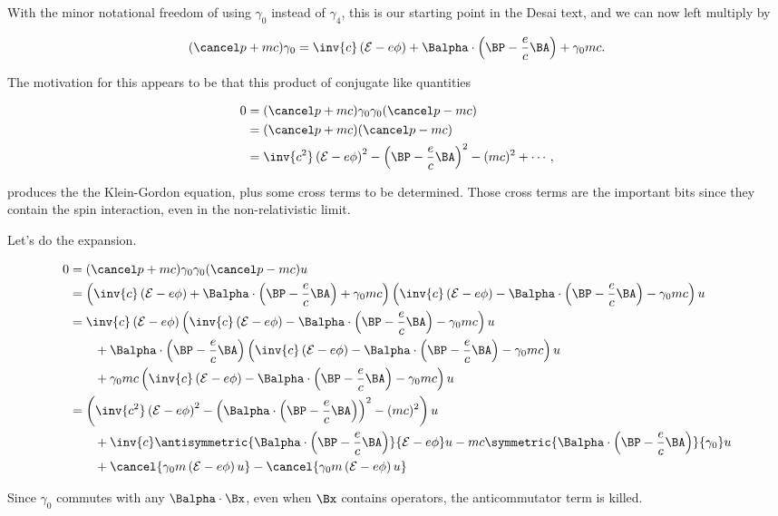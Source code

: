 With the minor notational freedom of using $\gamma_0$ instead of $\gamma_4$, this is our starting point in the Desai text, and we can now left multiply by

\begin{equation}\label{eqn:diracGauge:n}
(\pslash + m c) \gamma_0 = 
\inv{c} \left( \mathcal{E} - e \phi \right) 
+\Balpha \cdot \left(\BP - \frac{e}{c} \BA \right) 
+ \gamma_0 m c.
\end{equation}

The motivation for this appears to be that this product of conjugate like quantities

\begin{equation}\label{eqn:diracGauge:n}
\begin{aligned}
0 &= (\pslash + m c) \gamma_0 \gamma_0 (\pslash - m c)  \\
&=
(\pslash + m c) (\pslash - m c) \\
&= \inv{c^2} \left( \mathcal{E} - e \phi \right)^2
 -\left( \BP - \frac{e}{c} \BA \right)^2 - (m c)^2 + \cdots,
\end{aligned}
\end{equation}

produces the the Klein-Gordon equation, plus some cross terms to be determined.  Those cross terms are the important bits since they contain the spin interaction, even in the non-relativistic limit.

Let's do the expansion.

\begin{align*}
0 
&= (\pslash + m c) \gamma_0 \gamma_0 (\pslash - m c) u \\
&=
\left(
\inv{c} \left( \mathcal{E} - e \phi \right) 
+\Balpha \cdot \left(\BP - \frac{e}{c} \BA \right) 
+ \gamma_0 m c
\right)
\left(
\inv{c} \left( \mathcal{E}- e \phi \right) 
-\Balpha \cdot \left(\BP - \frac{e}{c} \BA \right) 
- \gamma_0 m c \right) u \\
&=
\inv{c} \left( \mathcal{E} - e \phi \right) 
\left(
\inv{c} \left( \mathcal{E}- e \phi \right) 
-\Balpha \cdot \left(\BP - \frac{e}{c} \BA \right) 
- \gamma_0 m c \right) u \\
&\qquad +\Balpha \cdot \left(\BP - \frac{e}{c} \BA \right) 
\left(
\inv{c} \left( \mathcal{E}- e \phi \right) 
-\Balpha \cdot \left(\BP - \frac{e}{c} \BA \right) 
- \gamma_0 m c \right) u \\
&\qquad + \gamma_0 m c
\left(
\inv{c} \left( \mathcal{E}- e \phi \right) 
-\Balpha \cdot \left(\BP - \frac{e}{c} \BA \right) 
- \gamma_0 m c \right) u \\
&=
\left(
\inv{c^2} \left( \mathcal{E} - e \phi \right)^2
- \left( \Balpha \cdot \left(\BP - \frac{e}{c} \BA \right) \right)^2
- (mc)^2 
\right) u
\\
&\qquad + \inv{c} \antisymmetric{
\Balpha \cdot \left(\BP - \frac{e}{c} \BA \right) 
}
{
\mathcal{E} - e \phi 
} u
- m c 
\symmetric{\Balpha \cdot \left(\BP - \frac{e}{c} \BA \right)}{ \gamma_0} u \\
&\qquad + \cancel{\gamma_0 m 
\left(
\mathcal{E} - e \phi 
\right) u
}
- \cancel{
\gamma_0 m 
\left(
\mathcal{E} - e \phi 
\right) u
}
\\
\end{align*}

Since $\gamma_0$ commutes with any $\Balpha \cdot \Bx$, even when $\Bx$ contains operators, the anticommutator term is killed.

\EndArticle
